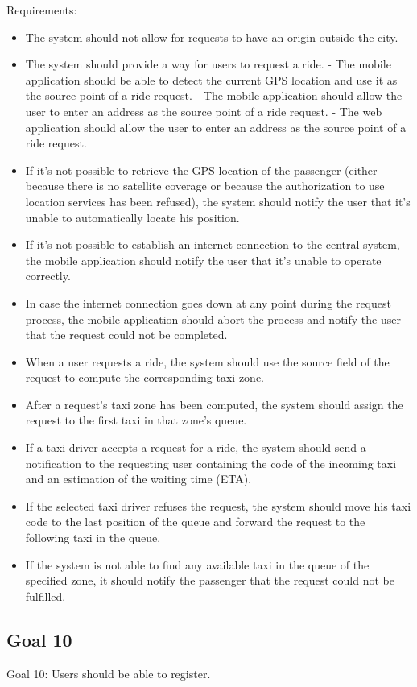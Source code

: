 Requirements:
\begin{itemize}
\item The system should not allow for requests to have an origin outside the city. 
\item The system should provide a way for users to request a ride.
	- The mobile application should be able to detect the current GPS location and use it as the source point of a ride request.
	- The mobile application should allow the user to enter an address as the source point of a ride request.
	- The web application should allow the user to enter an address as the source point of a ride request.
\item If it’s not possible to retrieve the GPS location of the passenger (either because there is no satellite coverage or because the authorization to use location services has been refused), the system should notify the user that it’s unable to automatically locate his position.
\item If it’s not possible to establish an internet connection to the central system, the mobile application should notify the user that it’s unable to operate correctly.
\item In case the internet connection goes down at any point during the request process, the mobile application should abort the process and notify the user that the request could not be completed.
\item When a user requests a ride, the system should use the source field of the request to compute the corresponding taxi zone. 
\item After a request’s taxi zone has been computed, the system should assign the request to the first taxi in that zone’s queue.
\item If a taxi driver accepts a request for a ride, the system should send a notification to the requesting user containing the code of the incoming taxi and an estimation of the waiting time (ETA).
\item If the selected taxi driver refuses the request, the system should move his taxi code to the last position of the queue and forward the request to the following taxi in the queue.
\item If the system is not able to find any available taxi in the queue of the specified zone, it should notify the passenger that the request could not be fulfilled. 
\end{itemize}

\subsection{Goal 10}
Goal 10: Users should be able to register.

